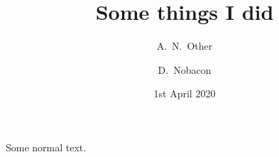 \documentclass{article}
\begin{document}
	\author{A.~N.~Other \and D.~Nobacon}    %
	\title{Some things I did}
	\date{1st April 2020}
	
	\maketitle
	
	Some normal text.
\end{document}
